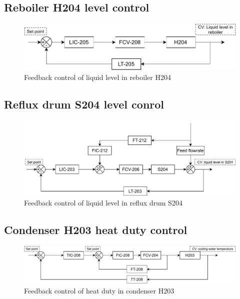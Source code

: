 \subsection{Reboiler H204 level control}

    \begin{figure}[H]
        \centering
        \includegraphics[width=0.9\linewidth]{chapters/4-operation-control/4-Figures/H204-LC.pdf}
        \caption{Feedback control of liquid level in reboiler H204}
        \label{fig:H204-LC}
    \end{figure}  

\subsection{Reflux drum S204 level conrol}

    \begin{figure}[H]
        \centering
        \includegraphics[width=0.9\linewidth]{chapters/4-operation-control/4-Figures/S204-LC.pdf}
        \caption{Feedback control of liquid level in reflux drum S204}
        \label{fig:S204-LC}
    \end{figure}  

\subsection{Condenser H203 heat duty control}

    \begin{figure}[H]
        \centering
        \includegraphics[width=0.9\linewidth]{chapters/4-operation-control/4-Figures/H203-TC.pdf}
        \caption{Feedback control of heat duty in condenser H203}
        \label{fig:H203-TC}
    \end{figure}  